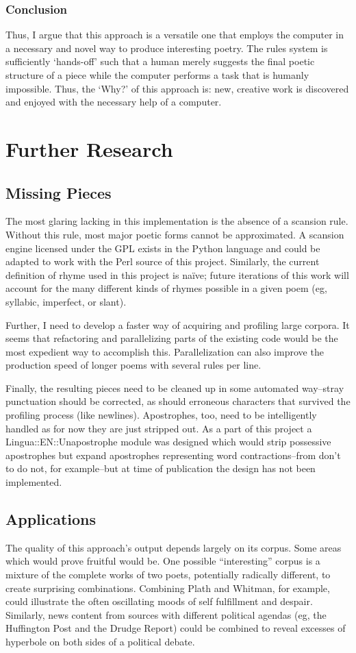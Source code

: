 \documentclass[10pt]{article}
\begin{document}
\subsubsection{Conclusion}
Thus, I argue that this approach is a versatile one that employs the computer in a
necessary and novel way to produce interesting poetry. The rules system is
sufficiently `hands-off' such that a human merely suggests the final poetic
structure of a piece while the computer performs a task that is humanly
impossible. Thus, the `Why?' of this approach is: new, creative work is
discovered and enjoyed with the necessary help of a computer.

\section{Further Research}
\subsection{Missing Pieces}
The most glaring lacking in this implementation is the absence of a scansion
rule. Without this rule, most major poetic forms cannot be approximated. A
scansion engine\cite{scandroid} licensed under the GPL exists in the Python
language and could be adapted to work with the Perl source of this project.
Similarly, the current definition of rhyme used in this project is na\"{i}ve;
future iterations of this work will account for the many different kinds of
rhymes possible in a given poem (eg, syllabic, imperfect, or slant).

Further, I need to develop a faster way of acquiring and
profiling large corpora. It seems that refactoring and parallelizing parts of
the existing code would be the most expedient way to accomplish this.
Parallelization can also improve the production speed of longer poems with
several rules per line.

Finally, the resulting pieces need to be cleaned up in some automated
way--stray punctuation should be corrected, as should erroneous characters that
survived the profiling process (like newlines). Apostrophes, too, need to be
intelligently handled as for now they are just stripped out. As a part of this
project a Lingua::EN::Unapostrophe module was designed which would strip
possessive apostrophes but expand apostrophes representing word
contractions--from don't to do not, for example--but at time of publication the
design has not been implemented.

\subsection{Applications}
The quality of this approach's output depends largely on its corpus. Some areas
which would prove fruitful would be. One possible ``interesting'' corpus is a
mixture of the complete works of two poets, potentially radically different, to
create surprising combinations. Combining Plath and Whitman, for example, could
illustrate the often oscillating moods of self fulfillment and despair.
Similarly, news content from sources with different political agendas (eg, the
Huffington Post and the Drudge Report) could be combined to reveal excesses of
hyperbole on both sides of a political debate.
\end{document}
